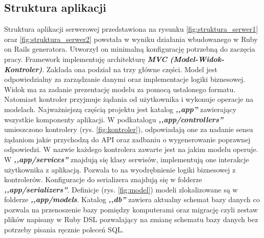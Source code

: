 \documentclass[declaration,shortabstract]{iithesis}
\begin{document}
\subsection{Struktura aplikacji}
Struktura aplikacji serwerowej przedstawiona na rysunku \ref{fig:struktura_serwer1} oraz \ref{fig:struktura_serwer2} powstała w wyniku działania wbudowanego w Ruby on Rails generatora. Utworzył on minimalną konfigurację potrzebną do zaczęcia pracy. Framework implementuję architekturę \textbf{\textit{MVC (Model-Widok-Kontroler)}}. Zakłada ona podział na trzy główne części. Model jest odpowiedzialny za zarządzanie danymi oraz implementacje logiki biznesowej. Widok ma za zadanie prezentację modelu za pomocą ustalonego formatu. Natomiast kontroler przyjmuje żądania od użytkownika i wykonuje operacje na modelach. Najważniejszą częścią projektu jest katalog \textbf{\textit{,,app''}} zawierający wszystkie komponenty aplikacji. W podkatalogu \textbf{\textit{,,app/controllers''}} umieszczono kontrolery (rys. \ref{fig:kontroler}), odpowiadają one za nadanie sensu żądaniom jakie przychodzą do API oraz zadbaniu o wygenerowanie poprawnej odpowiedzi. W nazwie każdego kontrolera zawarte jest na jakim modelu operuje. W \textbf{\textit{,,app/services''}} znajdują się klasy serwisów, implementują one interakcje użytkownika z aplikacją. Pozwala to na wyodrębnienie logiki biznesowej z kontrolerów. Konfiguracje do serializera znajdują się w folderze \textbf{\textit{,,app/serializers''}}. Definicje (rys. \ref{fig:model}) modeli zlokalizowane są w folderze \textbf{\textit{,,app/models}}. Katalog \textbf{\textit{,,db''}} zawiera aktualny schemat bazy danych co pozwala na przenoszenie bazy pomiędzy komputerami oraz migrację czyli zestaw plików napisany w Ruby DSL pozwalający na zmianę schematu bazy danych bez potrzeby pisania ręcznie poleceń SQL.
\end{document}
